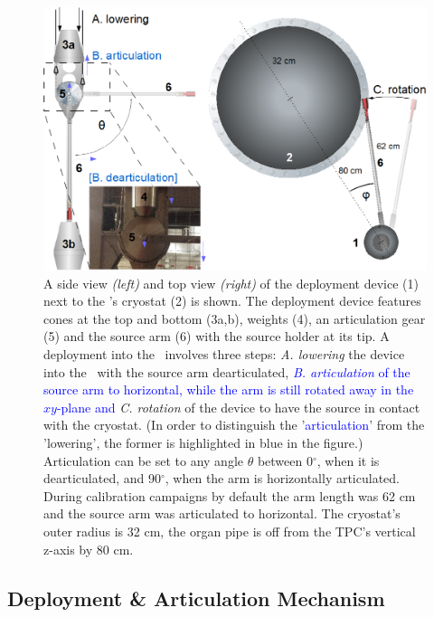 \begin{figure}[htbp]
 \centering
\includegraphics[width=\textwidth]{Figures/DeploymentDevice_XY_view2}
  \caption{A side view \textit{(left)} and top view \textit{(right)} of the deployment device (1) next to the \tpc's cryostat (2) is shown. The deployment device features cones at the top and bottom (3a,b), weights (4), an articulation gear (5) and the source arm (6) with the source holder at its tip. A deployment into the \lsv\ involves three steps: \textit{A. lowering} the device into the \lsv\ with the source arm dearticulated, \textcolor{blue}{\textit{B. articulation} of the source arm to horizontal, while the arm is still rotated away in the $xy$-plane and} \textit{C. rotation} of the device to have the source in contact with the cryostat. (In order to distinguish the '\textcolor{blue}{articulation}' from the 'lowering', the former is highlighted in blue in the figure.) Articulation can be set to any angle $\theta$ between 0$^{\circ}$, when it is dearticulated, and 90$^{\circ}$, when the arm is horizontally articulated. During calibration campaigns by default the arm length was 62 cm and the source arm was articulated to horizontal. The cryostat's outer radius is 32 cm, the organ pipe is off from the TPC's vertical z-axis by 80 cm.\label{fig:DeploymentDevice}}
\end{figure} 


\subsection{Deployment \& Articulation Mechanism}\label{sec:DeploymentArticulation}


